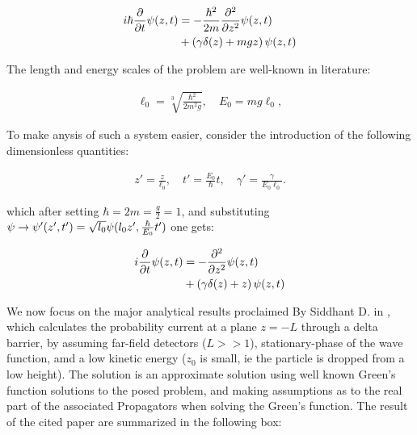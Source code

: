 \begin{align}
i\hbar \frac{\partial}{\partial t} \psi(z,t) &= -\frac{\hbar^2}{2m} \frac{\partial^2}{\partial z^2} \psi(z,t) \notag \\&+ \left( \gamma \delta(z) + mgz \right) \psi(z,t)
\end{align}

The length and energy scales of the problem are well-known in literature:

\begin{align}
    \ell_0 = \sqrt[3]{\frac{\hbar^2}{2m^2g}}, \quad E_0 = mg\ell_0, \tag{2}
\end{align}

To make anysis of such a system easier, consider the introduction of the following dimensionless quantities:

\begin{align}
    z' = \frac{z}{\ell_0}, \quad t' = \frac{E_0}{\hbar} t, \quad \gamma' = \frac{\gamma}{E_0 \ell_0}. \tag{3}
\end{align}

 which after setting $\hbar=2m=\frac{g}{2}=1$, and substituting $\psi \rightarrow \psi'(z', t') = \sqrt{l_0} \space \psi(l_0 z', \frac{\hbar}{E_0}t')$ one gets:

\begin{align}
    i \frac{\partial}{\partial t} \psi(z,t) &= -\frac{\partial^2}{\partial z^2} \psi(z,t) \notag \\&+ \left( \gamma \delta(z) + z \right) \psi(z,t)
\end{align}

We now focus on the major analytical results proclaimed By Siddhant D. in \cite{siddhant:paper}, which calculates the probability current at a plane $z=-L$ through a delta barrier, by assuming far-field detectors ($L >> 1$), stationary-phase of the wave function, amd a low kinetic energy ($z_0$ is small, ie the particle is dropped from a low height). The solution is an approximate solution using well known Green's function solutions to the posed problem, and making assumptions as to the real part of the associated Propagators when solving the Green's function. The result of the cited paper are summarized in the following box:


